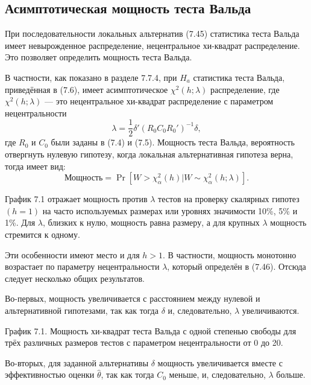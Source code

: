 \subsection{Асимптотическая мощность теста Вальда}

При последовательности локальных альтернатив (7.45) статистика теста Вальда имеет невырожденное распределение, нецентральное хи-квадрат распределение. Это позволяет определить мощность теста Вальда.

В частности, как показано в разделе 7.7.4, при $H_a$ статистика теста Вальда, приведённая в (7.6), имеет асимптотическое $\chi^2(h; \lambda)$ распределение, где $\chi^2(h; \lambda)$ --- это нецентральное хи-квадрат распределение с параметром нецентральности
\begin{equation}
\lambda = \frac{1}{2}\delta'(R_0C_0R_0')^{-1}\delta,
\end{equation}
где $R_0$ и $C_0$ были заданы в (7.4) и (7.5). Мощность теста Вальда, вероятность отвергнуть нулевую гипотезу, когда локальная альтернативная гипотеза верна, тогда имеет вид:
\begin{equation}
\text{Мощность} = \Pr[W > \chi_{\alpha}^2(h)| W \sim \chi_{\alpha}^2(h; \lambda)].
\end{equation}

График 7.1 отражает мощность против $\lambda$ тестов на проверку скалярных гипотез $(h = 1)$ на часто используемых размерах или уровнях значимости 10\%, 5\% и 1\%. Для $\lambda$, близких к нулю, мощность равна размеру, а для крупных $\lambda$ мощность стремится к одному.

Эти особенности имеют место и для $h > 1$. В частности, мощность монотонно возрастает по параметру нецентральности $\lambda$, который определён в (7.46). Отсюда следует несколько общих результатов.

Во-первых, мощность увеличивается с расстоянием между нулевой и альтернативной гипотезами, так как тогда $\delta$ и, следовательно, $\lambda$ увеличиваются.


\vspace{5cm}



График 7.1. Мощность хи-квадрат теста Вальда с одной степенью свободы для трёх различных размеров тестов с параметром нецентральности от 0 до 20.

Во-вторых, для заданной альтернативы $\delta$ мощность увеличивается вместе с эффективностью оценки $\hat{\theta}$, так как тогда $C_0$ меньше, и, следовательно, $\lambda$ больше.

